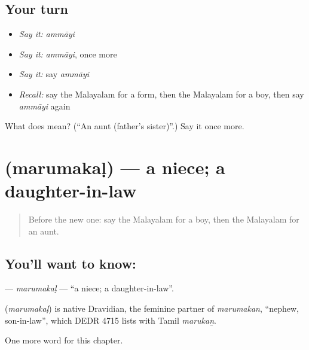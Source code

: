 \subsection*{Your turn}
\begin{itemize}
\raggedright
  \item \emph{Say it:} \emph{ammāyi}
  \item \emph{Say it:} \emph{ammāyi}, once more
  \item \emph{Say it:} say \emph{ammāyi}
  \item \emph{Recall:} say the Malayalam for a form, then the Malayalam for a boy, then say \emph{ammāyi} again
\end{itemize}

\begin{tcolorbox}[breakable,colback=teal!4,colframe=teal!35!black,title={Before you move on}]
What does  mean? (\textquotedblleft{}An aunt (father's sister)\textquotedblright{}.) Say it once more.
\end{tcolorbox}
\section[\texorpdfstring{\ml{മരുമകൾ} (marumakaḷ)}{മരുമകൾ (marumakaḷ)}]{ (marumakaḷ) — a niece; a daughter-in-law}

\label{lesson:ML-C289-marumakal}



\begin{quote}
Before the new one: say the Malayalam for a boy, then the Malayalam for an aunt.
\end{quote}

\subsection*{You'll want to know: }
\textbf{} — \emph{marumakaḷ} — \textquotedblleft{}a niece; a daughter-in-law\textquotedblright{}.

\begin{cousinweb}
\textbf{} (\emph{marumakaḷ}) is native Dravidian, the feminine partner of \emph{marumakan}, \textquotedblleft{}nephew, son-in-law\textquotedblright{}, which DEDR 4715 lists with Tamil \emph{marukaṉ}.
\end{cousinweb}

\begin{grammarlens}[title={What you've built}]
One more word for this chapter.
\end{grammarlens}

